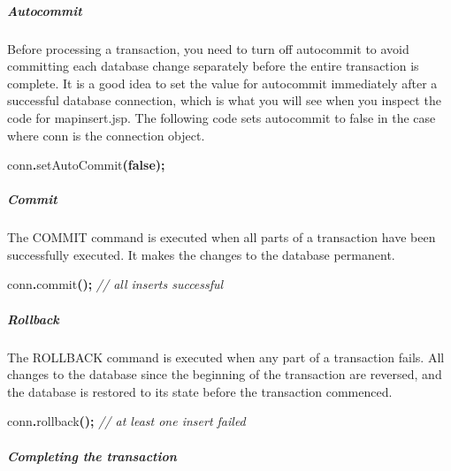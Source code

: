 \documentclass[
]{article}
\newenvironment{Shaded}{\begin{snugshade}}{\end{snugshade}}
\newcommand{\CommentTok}[1]{\textcolor[rgb]{0.56,0.35,0.01}{\textit{#1}}}
\newcommand{\FunctionTok}[1]{\textcolor[rgb]{0.00,0.00,0.00}{#1}}
\newcommand{\KeywordTok}[1]{\textcolor[rgb]{0.13,0.29,0.53}{\textbf{#1}}}
\newcommand{\NormalTok}[1]{#1}
\newcommand{\OperatorTok}[1]{\textcolor[rgb]{0.81,0.36,0.00}{\textbf{#1}}}
\begin{document}
\hypertarget{autocommit}{%
\subparagraph*{Autocommit}\label{autocommit}}

Before processing a transaction, you need to turn off autocommit to
avoid committing each database change separately before the entire
transaction is complete. It is a good idea to set the value for
autocommit immediately after a successful database connection, which is
what you will see when you inspect the code for mapinsert.jsp. The
following code sets autocommit to false in the case where conn is the
connection object.

\begin{Shaded}
\begin{Highlighting}[]
\NormalTok{conn}\OperatorTok{.}\FunctionTok{setAutoCommit}\OperatorTok{(}\KeywordTok{false}\OperatorTok{);}
\end{Highlighting}
\end{Shaded}

\hypertarget{commit}{%
\subparagraph*{Commit}\label{commit}}

The COMMIT command is executed when all parts of a transaction have been
successfully executed. It makes the changes to the database permanent.

\begin{Shaded}
\begin{Highlighting}[]
\NormalTok{conn}\OperatorTok{.}\FunctionTok{commit}\OperatorTok{();} \CommentTok{// all inserts successful}
\end{Highlighting}
\end{Shaded}

\hypertarget{rollback}{%
\subparagraph*{Rollback}\label{rollback}}

The ROLLBACK command is executed when any part of a transaction fails.
All changes to the database since the beginning of the transaction are
reversed, and the database is restored to its state before the
transaction commenced.

\begin{Shaded}
\begin{Highlighting}[]
\NormalTok{conn}\OperatorTok{.}\FunctionTok{rollback}\OperatorTok{();} \CommentTok{// at least one insert failed}
\end{Highlighting}
\end{Shaded}

\hypertarget{completing-the-transaction}{%
\subparagraph*{Completing the transaction}\label{completing-the-transaction}}
\end{document}
